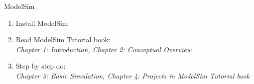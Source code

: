 \documentclass{vhdl-assignment}
\begin{document}
\begin{problem}{ModelSim}
    \begin{enumerate}
        \item Install ModelSim
        \item Read ModelSim Tutorial book: \\
        \emph{Chapter 1: Introduction, Chapter 2: Conceptual Overview}
        \item Step by step do: \\
        \emph{Chapter 3: Basic Simulation, Chapter 4: Projects in ModelSim Tutorial book}
    \end{enumerate}
\end{problem}
\end{document}
